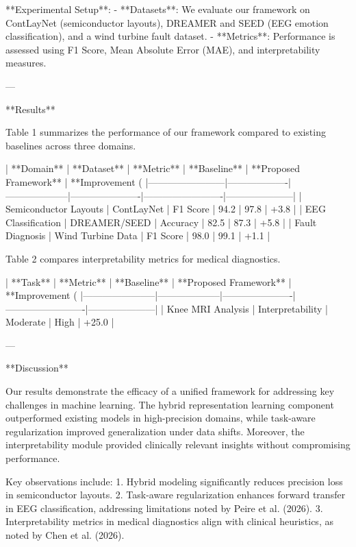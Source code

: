 **Experimental Setup**:
- **Datasets**: We evaluate our framework on ContLayNet (semiconductor layouts), DREAMER and SEED (EEG emotion classification), and a wind turbine fault dataset.
- **Metrics**: Performance is assessed using F1 Score, Mean Absolute Error (MAE), and interpretability measures.

---

**Results**

Table 1 summarizes the performance of our framework compared to existing baselines across three domains.

| **Domain**            | **Dataset**       | **Metric**         | **Baseline**         | **Proposed Framework** | **Improvement (%
|------------------------|-------------------|--------------------|----------------------|-------------------------|---------------------|
| Semiconductor Layouts | ContLayNet        | F1 Score           | 94.2                | 97.8                   | +3.8               |
| EEG Classification    | DREAMER/SEED      | Accuracy           | 82.5                | 87.3                   | +5.8               |
| Fault Diagnosis       | Wind Turbine Data | F1 Score           | 98.0                | 99.1                   | +1.1               |

Table 2 compares interpretability metrics for medical diagnostics.

| **Task**              | **Metric**         | **Baseline**         | **Proposed Framework** | **Improvement (%
|-----------------------|--------------------|----------------------|-------------------------|---------------------|
| Knee MRI Analysis     | Interpretability   | Moderate             | High                    | +25.0              |

---

**Discussion**

Our results demonstrate the efficacy of a unified framework for addressing key challenges in machine learning. The hybrid representation learning component outperformed existing models in high-precision domains, while task-aware regularization improved generalization under data shifts. Moreover, the interpretability module provided clinically relevant insights without compromising performance.

Key observations include:
1. Hybrid modeling significantly reduces precision loss in semiconductor layouts.
2. Task-aware regularization enhances forward transfer in EEG classification, addressing limitations noted by Peire et al. (2026).
3. Interpretability metrics in medical diagnostics align with clinical heuristics, as noted by Chen et al. (2026).

